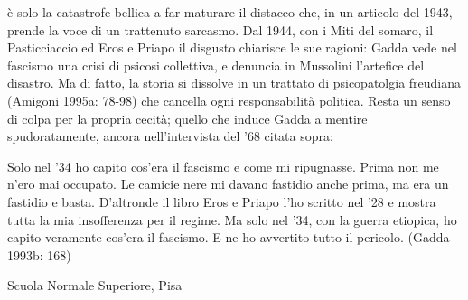 è solo la catastrofe bellica a far maturare il distacco che, in un articolo del 1943, prende la voce di un trattenuto sarcasmo. Dal 1944, con i Miti del somaro, il Pasticciaccio ed Eros e Priapo il disgusto chiarisce le sue ragioni: Gadda vede nel fascismo una crisi di psicosi collettiva, e denuncia in Mussolini l’artefice del disastro. Ma di fatto, la storia si dissolve in un trattato di psicopatolgia freudiana (Amigoni 1995a: 78-98) che cancella ogni responsabilità politica. Resta un senso di colpa per la propria cecità; quello che induce Gadda a mentire spudoratamente, ancora nell’intervista del ’68 citata sopra:

Solo nel ’34 ho capito cos’era il fascismo e come mi ripugnasse. Prima non me n’ero mai occupato. Le camicie nere mi davano fastidio anche prima, ma era un fastidio e basta. D’altronde il libro Eros e Priapo l’ho scritto nel ’28 e mostra tutta la mia insofferenza per il regime. Ma solo nel ’34, con la guerra etiopica, ho capito veramente cos’era il fascismo. E ne ho avvertito tutto il pericolo. (Gadda 1993b: 168)

Scuola Normale Superiore, Pisa

